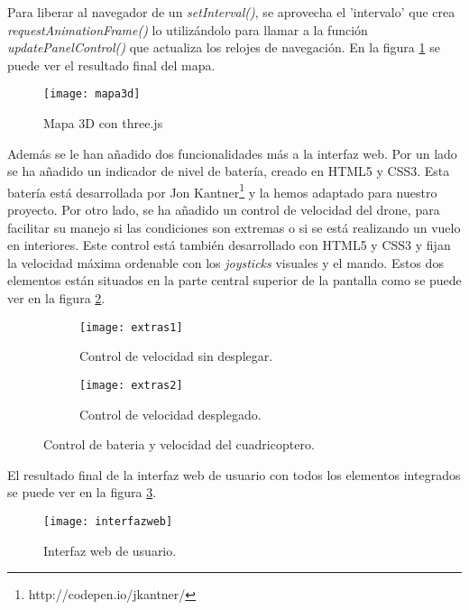 Para liberar al navegador de un \emph{setInterval()}, se aprovecha el 'intervalo' que crea \emph{requestAnimationFrame()} lo utilizándolo para llamar a la función \emph{updatePanelControl()} que actualiza los relojes de navegación. En la figura \ref{fig:mapa3d} se puede ver el resultado final del mapa.\\

\begin{figure}[h!]
\centering
\texttt{[image: mapa3d]}
\caption{Mapa 3D con three.js}
\label{fig:mapa3d}
\end{figure}


Además se le han añadido dos funcionalidades más a la interfaz web. Por un lado se ha añadido un indicador de nivel de batería, creado en HTML5 y CSS3. Esta batería está desarrollada por Jon Kantner\footnote{http://codepen.io/jkantner/}\cite{bateria} y la hemos adaptado para nuestro proyecto. Por otro lado, se ha añadido un control de velocidad del drone, para facilitar su manejo si las condiciones son extremas o si se está realizando un vuelo en interiores. Este control está también desarrollado con HTML5 y CSS3 y fijan la velocidad máxima ordenable con los \emph{joysticks} visuales y el mando. Estos dos elementos están situados en la parte central superior de la pantalla como se puede ver en la figura \ref{fig:bateriayvelocidad}.\\

\begin{figure}[h!]
\centering
  \begin{subfigure}[]{60mm}
    \texttt{[image: extras1]}
    \caption{Control de velocidad sin desplegar.} 
  \end{subfigure}
  \hspace{5pt}
  \begin{subfigure}[]{60mm}
    \texttt{[image: extras2]}
    \caption{Control de velocidad desplegado.}
  \end{subfigure}
  \caption{Control de bateria y velocidad del cuadricoptero.}\label{fig:bateriayvelocidad}
\end{figure}


El resultado final de la interfaz web de usuario con todos los elementos integrados se puede ver en la figura \ref{fig:interfazweb}.


\begin{figure}[h!]
\centering
\texttt{[image: interfazweb]}
\caption{Interfaz web de usuario.}
\label{fig:interfazweb}
\end{figure}
